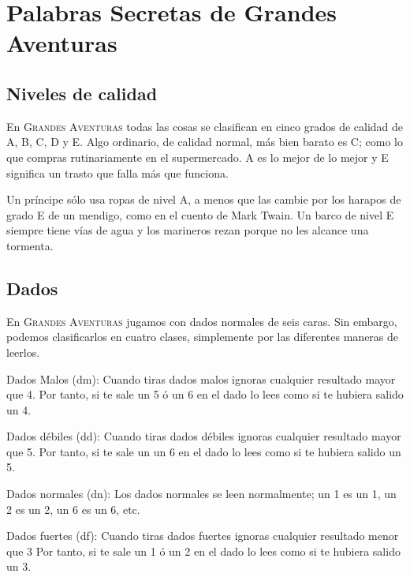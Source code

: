 \chapter{Palabras Secretas de Grandes Aventuras}

\section{Niveles de calidad}

En \textsc{Grandes Aventuras} todas las cosas se clasifican en cinco grados de calidad de A, B, C, D y E. Algo ordinario, de calidad normal, más bien barato es C; como lo que compras rutinariamente en el supermercado. A es lo mejor de lo mejor y E significa un trasto que falla más que funciona.

Un príncipe sólo usa ropas de nivel A, a menos que las cambie por los harapos de grado E de un mendigo, como en el cuento de Mark Twain. Un barco de nivel E siempre tiene vías de agua y los marineros rezan porque no les alcance una tormenta. 

\section{Dados}

En \textsc{Grandes Aventuras} jugamos con dados normales de seis caras. Sin embargo, podemos clasificarlos en cuatro clases, simplemente por las diferentes maneras de leerlos.

\begin{description}

\item{Dados Malos (dm):}
Cuando tiras dados malos ignoras cualquier resultado mayor que 4. Por tanto, si te sale un 5 ó un 6 en el dado lo lees como si te hubiera salido un 4.

\item{Dados débiles (dd):}
Cuando tiras dados débiles ignoras cualquier resultado mayor que 5. Por tanto, si te sale un un 6 en el dado lo lees como si te hubiera salido un 5.

\item{Dados normales (dn):}
Los dados normales se leen normalmente; un 1 es un 1, un 2 es un 2, un 6 es un 6, etc.

\item{Dados fuertes (df):} 
Cuando tiras dados fuertes ignoras cualquier resultado menor que 3 Por tanto, si te sale un 1 ó un 2 en el dado lo lees como si te hubiera salido un 3.

\end{description}

